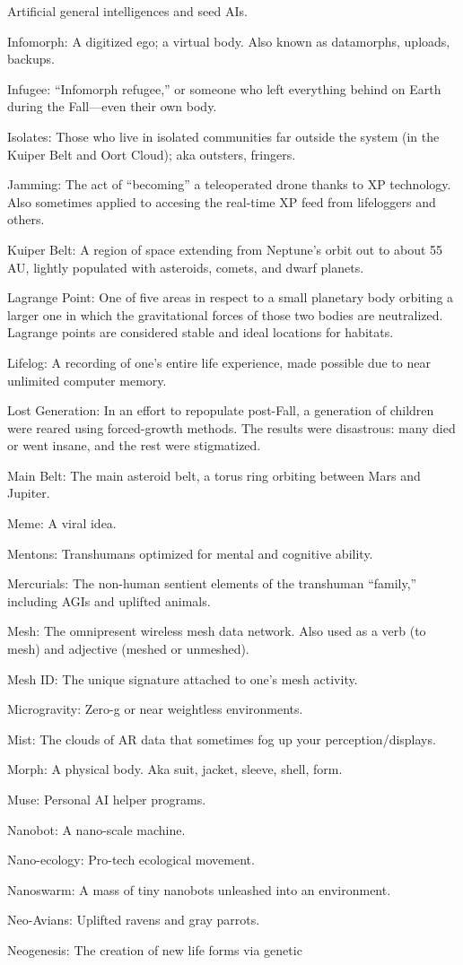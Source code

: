 Artificial general intelligences and seed AIs. \item Infomorph: A digitized ego; a virtual body. Also known as datamorphs, uploads, backups. \item Infugee: ``Infomorph refugee,'' or someone who left everything behind on Earth during the Fall—even their own body. \item Isolates: Those who live in isolated communities far outside the system (in the Kuiper Belt and Oort Cloud); aka outsters, fringers. \item Jamming: The act of ``becoming'' a teleoperated drone thanks to XP technology. Also sometimes applied to accesing the real-time XP feed from lifeloggers and others. \item Kuiper Belt: A region of space extending from Neptune's orbit out to about 55 AU, lightly populated with asteroids, comets, and dwarf planets. \item Lagrange Point: One of five areas in respect to a small planetary body orbiting a larger one in which the gravitational forces of those two bodies are neutralized. Lagrange points are considered stable and ideal locations for habitats. \item Lifelog: A recording of one's entire life experience, made possible due to near unlimited computer memory. \item Lost Generation: In an effort to repopulate post-Fall, a generation of children were reared using forced-growth methods. The results were disastrous: many died or went insane, and the rest were stigmatized. \item Main Belt: The main asteroid belt, a torus ring orbiting between Mars and Jupiter. \item Meme: A viral idea. \item Mentons: Transhumans optimized for mental and cognitive ability. \item Mercurials: The non-human sentient elements of the transhuman ``family,'' including AGIs and uplifted animals. \item Mesh: The omnipresent wireless mesh data network. Also used as a verb (to mesh) and adjective (meshed or unmeshed). \item Mesh ID: The unique signature attached to one's mesh activity. \item Microgravity: Zero-g or near weightless environments. \item Mist: The clouds of AR data that sometimes fog up your perception/displays. \item Morph: A physical body. Aka suit, jacket, sleeve, shell, form. \item Muse: Personal AI helper programs. \item Nanobot: A nano-scale machine. \item Nano-ecology: Pro-tech ecological movement. \item Nanoswarm: A mass of tiny nanobots unleashed into an environment. \item Neo-Avians: Uplifted ravens and gray parrots. \item Neogenesis: The creation of new life forms via genetic 